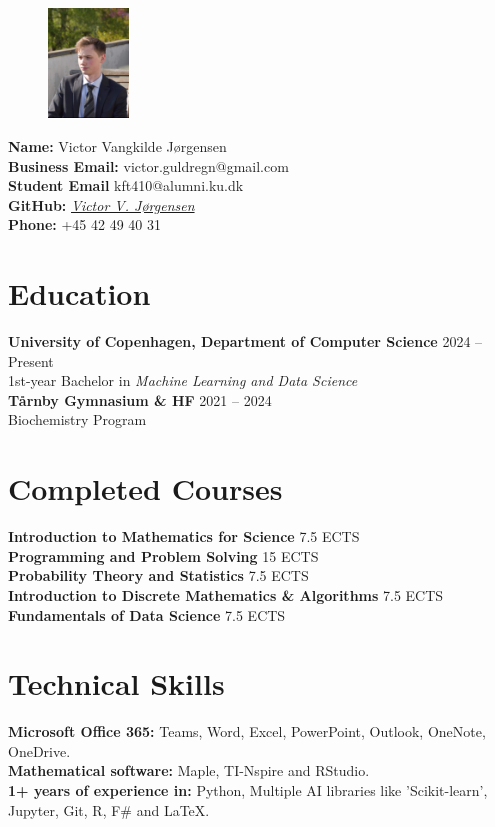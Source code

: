 \documentclass[a4paper,10pt]{article}
\makeatletter
\newcommand{\name}{Victor Vangkilde Jørgensen}
\newcommand{\phone}{+45 42 49 40 31}
\newcommand{\emailBusiness}{victor.guldregn@gmail.com}
\newcommand{\emailStudent}{kft410@alumni.ku.dk}
\makeatother
\begin{document}
\begin{figure}[h!]
    \centering
    \includegraphics[width=0.19\textwidth, trim={3cm 2cm 1.5cm 4cm}, clip, cfbox=gr 1.25pt 0pt]{profilbillede.jpg}
\end{figure}

\noindent
\textbf{Name:} \name\\
\textbf{Business Email:} \emailBusiness\\
\textbf{Student Email} \emailStudent\\
\textbf{GitHub:} \href{https://github.com/P1N60}{\textit{Victor V. Jørgensen}}\\
\textbf{Phone:} \phone

\section*{Education}
\textbf{University of Copenhagen, Department of Computer Science} \hfill 2024 -- Present \\
1st-year Bachelor in \textit{Machine Learning and Data Science}\\
\textbf{T\aa rnby Gymnasium \& HF} \hfill 2021 -- 2024\\ 
Biochemistry Program

\section*{Completed Courses}
\textbf{Introduction to Mathematics for Science} \hfill 7.5 ECTS\\
\textbf{Programming and Problem Solving} \hfill 15 ECTS\\
\textbf{Probability Theory and Statistics} \hfill 7.5 ECTS\\
\textbf{Introduction to Discrete Mathematics \& Algorithms} \hfill 7.5 ECTS\\ 
\textbf{Fundamentals of Data Science} \hfill 7.5 ECTS

\section*{Technical Skills}
\textbf{Microsoft Office 365:} Teams, Word, Excel, PowerPoint, Outlook, OneNote, OneDrive. \\
\textbf{Mathematical software:} Maple, TI-Nspire and RStudio. \\
\textbf{1+ years of experience in:} Python, Multiple AI libraries like 'Scikit-learn', Jupyter, Git, R, F\# and \LaTeX.
\end{document}
